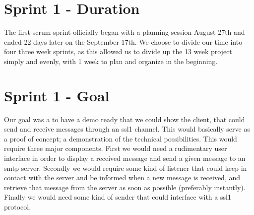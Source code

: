 \section{Sprint 1 - Duration}
The first scrum sprint officially began with a planning session August 27th and ended 22 days later on the September 17th. We choose to divide our time into four three week sprints, as this allowed us to divide up the 13 week project simply and evenly, with 1 week to plan and organize in the beginning.

\section{Sprint 1 - Goal}
Our goal was a to have a demo ready that we could show the client, that could send and receive messages through an \gls{ssl1} channel. This would basically serve as a proof of concept; a demonstration of the technical possibilities. This would require three major components. First we would need a rudimentary user interface in order to display a received message and send a given message to an \gls{smtp} server. Secondly we would require some kind of listener that could keep in contact with the server and be informed when a new message is received, and retrieve that message from the server as soon as possible (preferably instantly). Finally we would need some kind of sender that could interface with a \gls{ssl1} protocol.